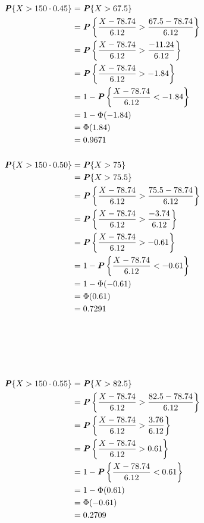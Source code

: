 \documentclass[12pt]{article}
\newcommand{\boldP}{\textbf{\textit{P}}}
\begin{document}
\begin{align*}
  \boldP\{X > 150 \cdot 0.45\}
    &= \boldP\{X > 67.5\} \\
    &= \boldP \left\{ \frac{X - 78.74}{6.12}
                    > \frac{67.5 - 78.74}{6.12} \right\} \\
    &= \boldP \left\{ \frac{X - 78.74}{6.12}
                    > \frac{-11.24}{6.12} \right\} \\
    &= \boldP \left\{ \frac{X - 78.74}{6.12} > -1.84 \right\} \\
    &= 1 - \boldP \left\{ \frac{X - 78.74}{6.12} < -1.84 \right\} \\
    &= 1 - \Phi(-1.84) \\
    &= \Phi(1.84) \\
    &= 0.9671 \\
\\
  \boldP\{X > 150 \cdot 0.50\}
    &= \boldP\{X > 75\} \\
    &= \boldP\{X > 75.5\} \\
    &= \boldP \left\{ \frac{X - 78.74}{6.12}
                    > \frac{75.5 - 78.74}{6.12} \right\} \\
    &= \boldP \left\{ \frac{X - 78.74}{6.12}
                    > \frac{-3.74}{6.12} \right\} \\
    &= \boldP \left\{ \frac{X - 78.74}{6.12} > -0.61 \right\} \\
    &= 1 - \boldP \left\{ \frac{X - 78.74}{6.12} < -0.61 \right\} \\
    &= 1 - \Phi(-0.61) \\
    &= \Phi(0.61) \\
    &= 0.7291 \\
\\ \\ \\ \\ \\
  \boldP\{X > 150 \cdot 0.55\}
    &= \boldP\{X > 82.5\} \\
    &= \boldP \left\{ \frac{X - 78.74}{6.12}
                    > \frac{82.5 - 78.74}{6.12} \right\} \\
    &= \boldP \left\{ \frac{X - 78.74}{6.12}
                    > \frac{3.76}{6.12} \right\} \\
    &= \boldP \left\{ \frac{X - 78.74}{6.12} > 0.61 \right\} \\
    &= 1 - \boldP \left\{ \frac{X - 78.74}{6.12} < 0.61 \right\} \\
    &= 1 - \Phi(0.61) \\
    &= \Phi(-0.61) \\
    &= 0.2709
\end{align*}
\end{document}
